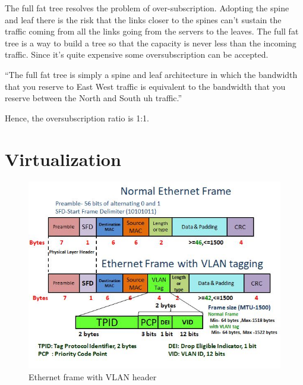 The full fat tree resolves the problem of over-subscription. Adopting
the spine and leaf there is the risk that the links closer to the spines can’t sustain the traffic coming from all the links going from the servers to the leaves. The full fat tree is a way to build a tree so that the capacity is never
less than the incoming traffic. Since it's quite expensive some oversubscription can be accepted.

\begin{definition}
   ``The full fat tree is simply a spine and leaf architecture in which the bandwidth that you reserve to East West traffic is equivalent to the bandwidth that you reserve between the North and South uh traffic.''

   Hence, the oversubscription ratio is 1:1.
\end{definition}

\section{Virtualization}


\begin{figure}[htbp]
   \centering
   \includegraphics{images/vlan_header.jpg}
   \caption{Ethernet frame with VLAN header}
   \label{fig:vlan_header}
\end{figure}

